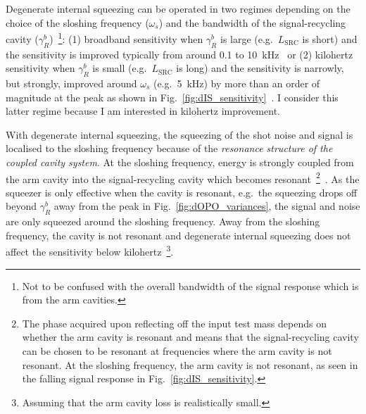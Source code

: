 Degenerate internal squeezing can be operated in two regimes depending on the choice of the sloshing frequency ($\omega_s$) and the bandwidth of the signal-recycling cavity ($\gamma^b_R$)~\footnote{Not to be confused with the overall bandwidth of the signal response which is from the arm cavities.}: (1) broadband sensitivity when $\gamma^b_R$ is large (e.g.\ $L_\text{SRC}$ is short) and the sensitivity is improved typically from around 0.1 to 10~kHz~\cite{korobkoQuantumExpanderGravitationalwave2019} or (2) kilohertz sensitivity when $\gamma^b_R$ is small (e.g.\ $L_\text{SRC}$ is long) and the sensitivity is narrowly, but strongly, improved around $\omega_s$ (e.g.\ 5~kHz) by more than an order of magnitude at the peak as shown in Fig.~\ref{fig:dIS_sensitivity}~\cite{adyaQuantumEnhancedKHz2020}. I consider this latter regime because I am interested in kilohertz improvement.

With degenerate internal squeezing, the squeezing of the shot noise and signal is localised to the sloshing frequency because of the \emph{resonance structure of the coupled cavity system}. At the sloshing frequency, energy is strongly coupled from the arm cavity into the signal-recycling cavity which becomes resonant~\footnote{The phase acquired upon reflecting off the input test mass depends on whether the arm cavity is resonant and means that the signal-recycling cavity can be chosen to be resonant at frequencies where the arm cavity is not resonant. At the sloshing frequency, the arm cavity is not resonant, as seen in the falling signal response in Fig.~\ref{fig:dIS_sensitivity}.}~\cite{korobkoTamingQuantumNoiseHow2020}. As the squeezer is only effective when the cavity is resonant, e.g.\ the squeezing drops off beyond $\gamma^b_R$ away from the peak in Fig.~\ref{fig:dOPO_variances}, the signal and noise are only squeezed around the sloshing frequency. Away from the sloshing frequency, the cavity is not resonant and degenerate internal squeezing does not affect the sensitivity below kilohertz~\footnote{Assuming that the arm cavity loss is realistically small.}.

